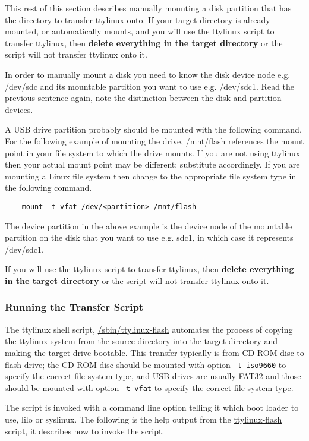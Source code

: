 \documentclass[10pt]{article}
\begin{document}
This rest of this section describes manually mounting a disk partition that has
the directory to transfer ttylinux onto. If your target directory is already
mounted, or automatically mounts, and you will use the ttylinux script to
transfer ttylinux, then {\bf delete everything in the target directory} or the
script will not transfer ttylinux onto it.

In order to manually mount a disk you need to know the disk device node e.g.
/dev/sdc and its mountable partition you want to use e.g. /dev/sdc1. Read the
previous sentence again, note the distinction between the disk and partition
devices.

A USB drive partition probably should be mounted with the following command.
For the following example of mounting the drive, /mnt/flash references the
mount point in your file system to which the drive mounts. If you are not using
ttylinux then your actual mount point may be different; substitute accordingly.
If you are mounting a Linux file system then change to the appropriate file
system type in the following command.

\begin{lstlisting}
	mount -t vfat /dev/<partition> /mnt/flash
\end{lstlisting}

The device partition in the above example is the device node of the mountable
partition on the disk that you want to use e.g. sdc1, in which case it
represents /dev/sdc1.

If you will use the ttylinux script to transfer ttylinux, then {\bf delete
everything in the target directory} or the script will not transfer ttylinux
onto it.

\subsubsection{Running the Transfer Script}

The ttylinux shell script, \url{/sbin/ttylinux-flash} automates the process of
copying the ttylinux system from the source directory into the target directory
and making the target drive bootable. This transfer typically is from CD-ROM
disc to flash drive; the CD-ROM disc should be mounted with option {\tt -t
iso9660} to specify the correct file system type, and USB drives are usually
FAT32 and those should be mounted with option {\tt -t vfat} to specify the
correct file system type.

The script is invoked with a command line option telling it which boot loader
to use, lilo or syslinux. The following is the help output from the
\url{ttylinux-flash} script, it describes how to invoke the script.
\end{document}
